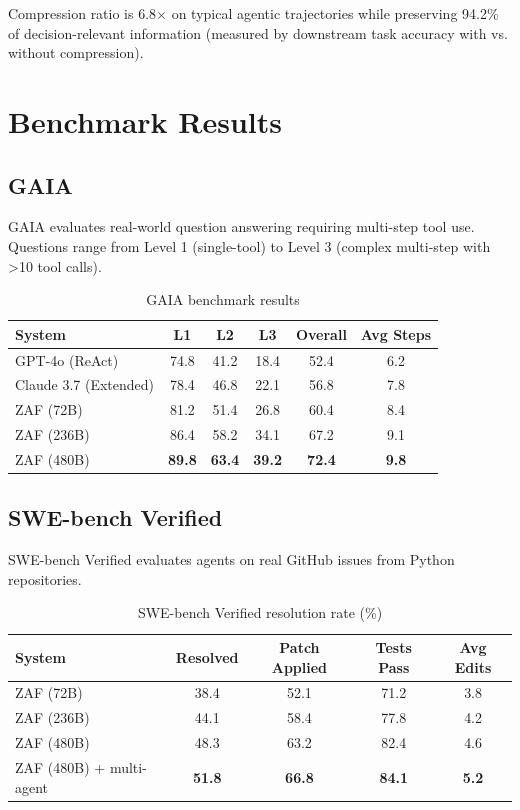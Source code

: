 \documentclass[11pt,a4paper]{article}
\begin{document}
Compression ratio is 6.8$\times$ on typical agentic trajectories while preserving 94.2\% of decision-relevant information (measured by downstream task accuracy with vs. without compression).

\section{Benchmark Results}

\subsection{GAIA}

GAIA evaluates real-world question answering requiring multi-step tool use. Questions range from Level 1 (single-tool) to Level 3 (complex multi-step with >10 tool calls).

\begin{table}[H]
\centering
\caption{GAIA benchmark results}
\label{tab:gaia}
\begin{tabular}{lccccc}
\toprule
System & L1 & L2 & L3 & Overall & Avg Steps \\
\midrule
GPT-4o (ReAct) & 74.8 & 41.2 & 18.4 & 52.4 & 6.2 \\
Claude 3.7 (Extended) & 78.4 & 46.8 & 22.1 & 56.8 & 7.8 \\
ZAF (72B) & 81.2 & 51.4 & 26.8 & 60.4 & 8.4 \\
ZAF (236B) & 86.4 & 58.2 & 34.1 & 67.2 & 9.1 \\
ZAF (480B) & \textbf{89.8} & \textbf{63.4} & \textbf{39.2} & \textbf{72.4} & \textbf{9.8} \\
\bottomrule
\end{tabular}
\end{table}

\subsection{SWE-bench Verified}

SWE-bench Verified evaluates agents on real GitHub issues from Python repositories.

\begin{table}[H]
\centering
\caption{SWE-bench Verified resolution rate (\%)}
\label{tab:swe}
\begin{tabular}{lcccc}
\toprule
System & Resolved & Patch Applied & Tests Pass & Avg Edits \\
\midrule
ZAF (72B) & 38.4 & 52.1 & 71.2 & 3.8 \\
ZAF (236B) & 44.1 & 58.4 & 77.8 & 4.2 \\
ZAF (480B) & 48.3 & 63.2 & 82.4 & 4.6 \\
ZAF (480B) + multi-agent & \textbf{51.8} & \textbf{66.8} & \textbf{84.1} & \textbf{5.2} \\
\bottomrule
\end{tabular}
\end{table}
\end{document}
